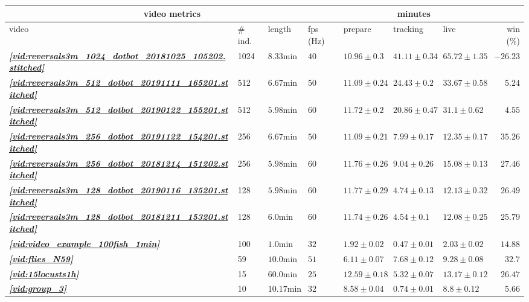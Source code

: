 \documentclass[9pt,lineno]{elife}
\newcommand{\vidref}[1]{\textit{\textbf{\ref{#1}}}}
\begin{document}
\begin{table}[h]
\begin{tabular}{l l l l | l l l | r}
\toprule
\multicolumn{4}{c|}{video metrics} & \multicolumn{3}{c|}{minutes} & \\
\midrule
video & {\# ind.} & length & fps (Hz) & prepare &  tracking  & live & win (\%)   \\
\midrule

\vidref{vid:reversals3m_1024_dotbot_20181025_105202.stitched} & 1024 & $ 8.33 \mathrm{min} $ & $ 40 $ & $ 10.96 \pm 0.3 $ & $ 41.11 \pm 0.34 $ & $ 65.72 \pm 1.35 $ &$ -26.23 $ \\
\vidref{vid:reversals3m_512_dotbot_20191111_165201.stitched} & 512 & $ 6.67 \mathrm{min} $ & $ 50 $ & $ 11.09 \pm 0.24 $ & $ 24.43 \pm 0.2 $ & $ 33.67 \pm 0.58 $ &$ 5.24 $ \\
\vidref{vid:reversals3m_512_dotbot_20190122_155201.stitched} & 512 & $ 5.98 \mathrm{min} $ & $ 60 $ & $ 11.72 \pm 0.2 $ & $ 20.86 \pm 0.47 $ & $ 31.1 \pm 0.62 $ &$ 4.55 $ \\
\vidref{vid:reversals3m_256_dotbot_20191122_154201.stitched} & 256 & $ 6.67 \mathrm{min} $ & $ 50 $ & $ 11.09 \pm 0.21 $ & $ 7.99 \pm 0.17 $ & $ 12.35 \pm 0.17 $ &$ 35.26 $ \\
\vidref{vid:reversals3m_256_dotbot_20181214_151202.stitched} & 256 & $ 5.98 \mathrm{min} $ & $ 60 $ & $ 11.76 \pm 0.26 $ & $ 9.04 \pm 0.26 $ & $ 15.08 \pm 0.13 $ &$ 27.46 $ \\
\vidref{vid:reversals3m_128_dotbot_20190116_135201.stitched} & 128 & $ 5.98 \mathrm{min} $ & $ 60 $ & $ 11.77 \pm 0.29 $ & $ 4.74 \pm 0.13 $ & $ 12.13 \pm 0.32 $ &$ 26.49 $ \\
\vidref{vid:reversals3m_128_dotbot_20181211_153201.stitched} & 128 & $ 6.0 \mathrm{min} $ & $ 60 $ & $ 11.74 \pm 0.26 $ & $ 4.54 \pm 0.1 $ & $ 12.08 \pm 0.25 $ &$ 25.79 $ \\
\vidref{vid:video_example_100fish_1min} & 100 & $ 1.0 \mathrm{min} $ & $ 32 $ & $ 1.92 \pm 0.02 $ & $ 0.47 \pm 0.01 $ & $ 2.03 \pm 0.02 $ &$ 14.88 $ \\
\vidref{vid:flies_N59} & 59 & $ 10.0 \mathrm{min} $ & $ 51 $ & $ 6.11 \pm 0.07 $ & $ 7.68 \pm 0.12 $ & $ 9.28 \pm 0.08 $ &$ 32.7 $ \\
\vidref{vid:15locusts1h} & 15 & $ 60.0 \mathrm{min} $ & $ 25 $ & $ 12.59 \pm 0.18 $ & $ 5.32 \pm 0.07 $ & $ 13.17 \pm 0.12 $ &$ 26.47 $ \\
\vidref{vid:group_3} & 10 & $ 10.17 \mathrm{min} $ & $ 32 $ & $ 8.58 \pm 0.04 $ & $ 0.74 \pm 0.01 $ & $ 8.8 \pm 0.12 $ &$ 5.66 $ \\

\end{tabular}
\end{table}
\end{document}
